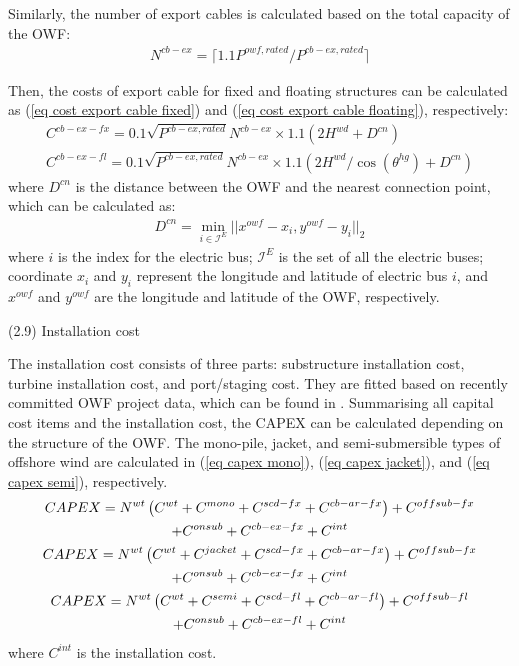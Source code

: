 \documentclass[sn-mathphys,Numbered]{sn-jnl}%
\theoremstyle{plain}%
\theoremstyle{definition}%
\theoremstyle{remark}%
\begin{document}
Similarly, the number of export cables is calculated based on the total capacity of the OWF:
\begin{gather}
    N^{cb-ex} = \lceil 1.1 P^{owf,rated} / P^{cb-ex,rated} \rceil
\end{gather}

Then, the costs of export cable for fixed and floating structures can be calculated as (\ref{eq cost export cable fixed}) and (\ref{eq cost export cable floating}), respectively:
\begin{gather}
    C^{cb-ex-fx} =  0.1 \sqrt{P^{cb-ex,rated}} N^{cb-ex} \times 1.1 (2 H^{wd} + D^{cn})
\label{eq cost export cable fixed} \\
    C^{cb-ex-fl} =  0.1 \sqrt{P^{cb-ex,rated}} N^{cb-ex} \times 1.1 (2 H^{wd}/\cos{(\theta^{hg})} + D^{cn})
\label{eq cost export cable floating} 
\end{gather}
where $D^{cn}$ is the distance between the OWF and the nearest connection point, which can be calculated as:
\begin{gather}
    D^{cn} = \min_{i \in \mathcal{I}^{E}} ||x^{owf}-x_i, y^{owf}-y_i||_2
\label{eq distance to power bus}
\end{gather}
where $i$ is the index for the electric bus; $\mathcal{I}^{E}$ is the set of all the electric buses; coordinate $x_i$ and $y_i$ represent the longitude and latitude of electric bus $i$, and $x^{owf}$ and $y^{owf}$ are the longitude and latitude of the OWF, respectively.

(2.9) Installation cost

The installation cost consists of three parts: substructure installation cost, turbine installation cost, and port/staging cost. They are fitted based on recently committed OWF project data, which can be found in \cite{ASpatialEconomic}.
Summarising all capital cost items and the installation cost, the CAPEX can be calculated depending on the structure of the OWF. The mono-pile, jacket, and semi-submersible types of offshore wind are calculated in (\ref{eq capex mono}), (\ref{eq capex jacket}), and (\ref{eq capex semi}), respectively.
\begin{gather}
    CAPEX = N^{wt} \left( C^{wt} + C^{mono} + C^{scd-fx} + C^{cb-ar-fx} \right) + C^{offsub-fx} \notag\\
    + C^{onsub} + C^{cb-ex-fx} + C^{int}
\label{eq capex mono} \\
    CAPEX = N^{wt} \left( C^{wt} + C^{jacket} + C^{scd-fx} + C^{cb-ar-fx} \right) + C^{offsub-fx} 
    \notag\\
    + C^{onsub} + C^{cb-ex-fx} + C^{int}
\label{eq capex jacket} \\
    CAPEX = N^{wt} \left( C^{wt} + C^{semi} + C^{scd-fl} + C^{cb-ar-fl} \right) + C^{offsub-fl} 
    \notag\\
    + C^{onsub} + C^{cb-ex-fl} + C^{int}
\label{eq capex semi}
\end{gather}
where $C^{int}$ is the installation cost.
\end{document}
